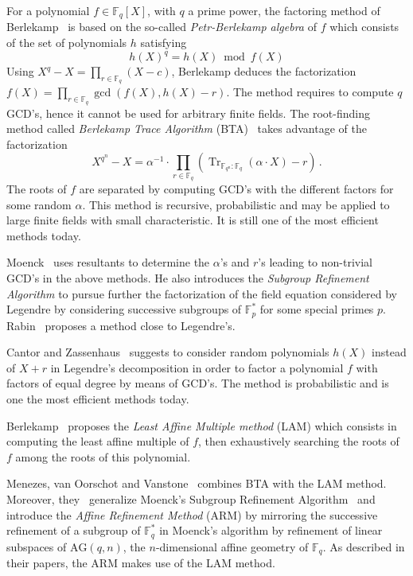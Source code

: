 \documentclass{sig-alternate}
\newcommand{\ff}[1]{\mathbb{F}_{#1}}
\newcommand{\qq}{q}
\newcommand{\nn}{n}
\newcommand{\basef}{\ff{\qq}}
\newcommand{\AG}{\mathrm{AG}(\qq,\nn)}
\DeclareMathOperator{\Tr}{Tr}
\newcommand{\tr}[2]{\Tr_{\ff{#1}:\ff{#2}}}
\newcounter{algo}
\begin{document}

For a polynomial $f \in  \mathbb{F}_\qq[X]$, with $\qq$ a prime power, the factoring method of Berlekamp~\cite{berl67} is based on the so-called \emph{Petr-Berlekamp algebra} of $f$ which consists of the set of polynomials $h$ satisfying  
$$h(X)^q=h(X) \bmod{f(X)}$$
Using 
$X^{\qq}-X=\prod_{r\in \basef}(X-c)$,
Berlekamp deduces the factorization $f(X)=\prod_{r \in \mathbb{F}_{\qq}} \gcd(f(X),h(X)-r)$. The method %
requires to compute $\qq$ GCD's, hence it cannot be used for arbitrary finite fields. The root-finding method called \emph{Berlekamp Trace Algorithm} (BTA)~\cite{berl70} takes advantage of the factorization 
$$X^{\qq^n}-X=\alpha^{-1} \cdot \prod_{r \in \basef}(\tr{\qq^n}{\qq}(\alpha \cdot X)-r)\,.$$
The roots of $f$ are separated by computing GCD's with the different factors for some random $\alpha$. This method is recursive, probabilistic and may be applied to large finite fields with small characteristic. It is still one of the most efficient methods today.

Moenck~\cite{Moenck77} uses resultants to determine the $\alpha$'s and $r$'s leading to non-trivial GCD's in the above methods. He also introduces the \emph{Subgroup Refinement Algorithm} to pursue further the factorization of the field equation considered by Legendre by considering successive subgroups of $\mathbb{F}_{p}^\ast$ for some special primes $p$.
Rabin~\cite{Rabin79} proposes a method close to Legendre's. 

Cantor and Zassenhaus~\cite{cantor1981} suggests to consider random polynomials $h(X)$ instead of $X+r$ in Legendre's decomposition in order to factor a polynomial $f$ with factors of equal degree by means of GCD's. The method is probabilistic and is one the most efficient methods today.

Berlekamp~\cite{mBER84a} proposes the \emph{Least Affine Multiple method} (LAM) which consists in computing the least affine multiple of $f$, then exhaustively searching the roots of $f$ among the roots of this polynomial. 

Menezes, van Oorschot and Vanstone~\cite{MenezesOV88,OorschotV89} combines BTA with the LAM method. Moreover, they~\cite{Menvanovans92} generalize Moenck's Subgroup Refinement Algorithm~\cite{Moenck77} and 
introduce the \emph{Affine Refinement Method} (ARM) by mirroring the successive refinement of a subgroup of $\mathbb{F}_{\qq}^\ast$ in Moenck's algorithm 
by refinement of linear subspaces of $\AG$, the $\nn$-dimensional affine geometry of $\mathbb{F}_{\qq}$. %
As described in their papers, the ARM makes use of the LAM method.
\end{document}
